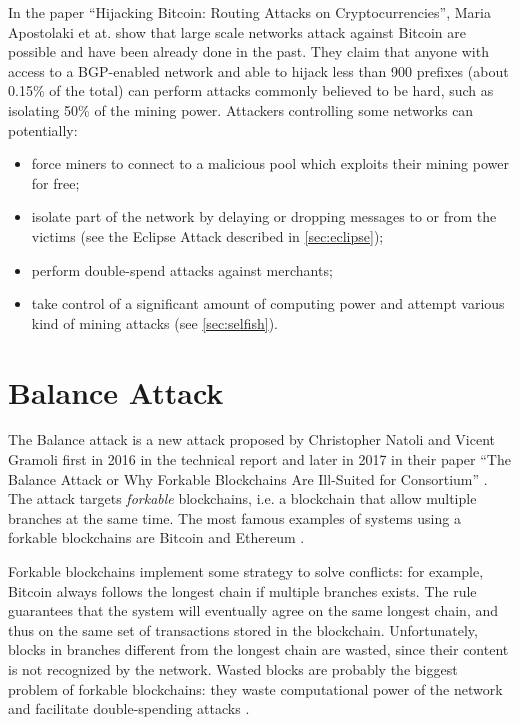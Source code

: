 \medskip
In the paper ``Hijacking Bitcoin: Routing Attacks on Cryptocurrencies'', Maria Apostolaki et at. show that large scale networks attack against Bitcoin are possible and have been already done in the past.
They claim that anyone with access to a BGP-enabled network and able to hijack less than \num{900} prefixes (about \num{0.15}\% of the total) can perform attacks commonly believed to be hard, such as isolating \num{50}\% of the mining power.
Attackers controlling some networks can potentially:
\begin{itemize}
	\item force miners to connect to a malicious pool which exploits their mining power for free;
	\item isolate part of the network by delaying or dropping messages to or from the victims (see the Eclipse Attack described in \cref{sec:eclipse});
	\item perform double-spend attacks against merchants;
	\item take control of a significant amount of computing power and attempt various kind of mining attacks (see \cref{sec:selfish}).
\end{itemize}


\section{Balance Attack}
\label{sec:balance}
The Balance attack is a new attack proposed by Christopher Natoli and Vicent Gramoli first in \num{2016} in the technical report \cite{balance_attack_report_2016} and later in \num{2017} in their paper ``The Balance Attack or Why Forkable Blockchains Are Ill-Suited for Consortium'' \cite{balance_attack_2017}.
The attack targets \textit{forkable} blockchains, i.e. a blockchain that allow multiple branches at the same time.
The most famous examples of systems using a forkable blockchains are Bitcoin \cite{bitcoin_2009} and Ethereum \cite{ethereum_2014}.

\medskip
Forkable blockchains implement some strategy to solve conflicts:
for example, Bitcoin always follows the longest chain if multiple branches exists.
The rule guarantees that the system will eventually agree on the same longest chain, and thus on the same set of transactions stored in the blockchain.
Unfortunately, blocks in branches different from the longest chain are wasted, since their content is not recognized by the network.
Wasted blocks are probably the biggest problem of forkable blockchains:
they waste computational power of the network and facilitate double-spending attacks \cite{double_spending_fast_analysis_2014}.

